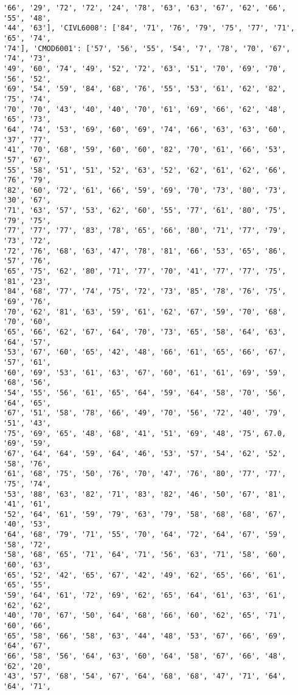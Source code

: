 \documentclass[11pt]{article}
\begin{document}
\begin{Verbatim}[commandchars=\\\{\}]
'66', '29', '72', '72', '24', '78', '63', '63', '67', '62', '66', '55', '48',
'44', '63'], 'CIVL6008': ['84', '71', '76', '79', '75', '77', '71', '65', '74',
'74'], 'CMOD6001': ['57', '56', '55', '54', '7', '78', '70', '67', '74', '73',
'49', '60', '74', '49', '52', '72', '63', '51', '70', '69', '70', '56', '52',
'69', '54', '59', '84', '68', '76', '55', '53', '61', '62', '82', '75', '74',
'70', '70', '43', '40', '40', '70', '61', '69', '66', '62', '48', '65', '73',
'64', '74', '53', '69', '60', '69', '74', '66', '63', '63', '60', '37', '77',
'41', '70', '68', '59', '60', '60', '82', '70', '61', '66', '53', '57', '67',
'55', '58', '51', '51', '52', '63', '52', '62', '61', '62', '66', '76', '79',
'82', '60', '72', '61', '66', '59', '69', '70', '73', '80', '73', '30', '67',
'71', '63', '57', '53', '62', '60', '55', '77', '61', '80', '75', '79', '75',
'77', '77', '77', '83', '78', '65', '66', '80', '71', '77', '79', '73', '72',
'72', '76', '68', '63', '47', '78', '81', '66', '53', '65', '86', '57', '76',
'65', '75', '62', '80', '71', '77', '70', '41', '77', '77', '75', '81', '23',
'84', '68', '77', '74', '75', '72', '73', '85', '78', '76', '75', '69', '76',
'70', '62', '81', '63', '59', '61', '62', '67', '59', '70', '68', '70', '60',
'65', '66', '62', '67', '64', '70', '73', '65', '58', '64', '63', '64', '57',
'53', '67', '60', '65', '42', '48', '66', '61', '65', '66', '67', '57', '61',
'60', '69', '53', '61', '63', '67', '60', '61', '61', '69', '59', '68', '56',
'54', '55', '56', '61', '65', '64', '59', '64', '58', '70', '56', '64', '65',
'67', '51', '58', '78', '66', '49', '70', '56', '72', '40', '79', '51', '43',
'75', '69', '65', '48', '68', '41', '51', '69', '48', '75', 67.0, '69', '59',
'67', '64', '64', '59', '64', '46', '53', '57', '54', '62', '52', '58', '76',
'61', '68', '75', '50', '76', '70', '47', '76', '80', '77', '77', '75', '74',
'53', '88', '63', '82', '71', '83', '82', '46', '50', '67', '81', '41', '61',
'52', '64', '61', '59', '79', '63', '79', '58', '68', '68', '67', '40', '53',
'64', '68', '79', '71', '55', '70', '64', '72', '64', '67', '59', '58', '72',
'58', '68', '65', '71', '64', '71', '56', '63', '71', '58', '60', '60', '63',
'65', '52', '42', '65', '67', '42', '49', '62', '65', '66', '61', '65', '55',
'59', '64', '61', '72', '69', '62', '65', '64', '61', '63', '61', '62', '62',
'40', '70', '67', '50', '64', '68', '66', '60', '62', '65', '71', '60', '66',
'65', '58', '66', '58', '63', '44', '48', '53', '67', '66', '69', '64', '67',
'66', '58', '56', '64', '63', '60', '64', '58', '67', '66', '48', '62', '20',
'43', '57', '68', '54', '67', '64', '68', '68', '47', '71', '64', '64', '71',

\end{Verbatim}
\end{document}
